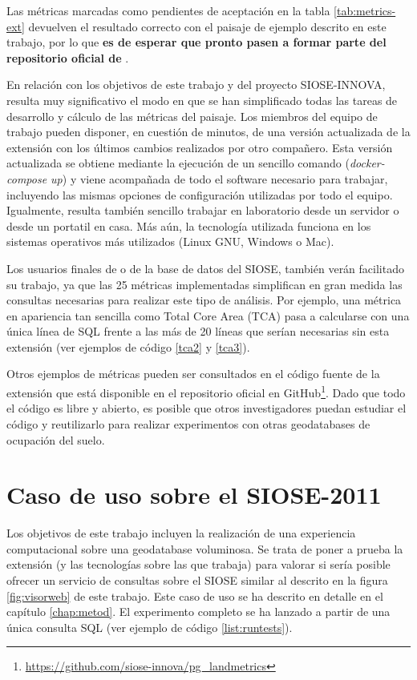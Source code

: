 Las métricas marcadas como pendientes de aceptación en la tabla \ref{tab:metrics-ext} devuelven el resultado correcto con el paisaje de ejemplo descrito en este trabajo, por lo que \textbf{es de esperar que pronto pasen a formar parte del repositorio oficial de \pgland{}}.

En relación con los objetivos de este trabajo y del proyecto SIOSE-INNOVA, resulta muy significativo el modo en que se han simplificado todas las tareas de desarrollo y cálculo de las métricas del paisaje. Los miembros del equipo de trabajo pueden disponer, en cuestión de minutos, de una versión actualizada de la extensión \pgland{} con los últimos cambios realizados por otro compañero. Esta versión actualizada se obtiene mediante la ejecución de un sencillo comando (\textit{docker-compose up}) y viene acompañada de todo el software necesario para trabajar, incluyendo las mismas opciones de configuración utilizadas por todo el equipo. Igualmente, resulta también sencillo trabajar en laboratorio desde un servidor o desde un portatil en casa. Más aún, la tecnología utilizada funciona en los sistemas operativos más utilizados (Linux GNU, Windows o Mac). 

Los usuarios finales de \pgland{} o de la base de datos del SIOSE, también verán facilitado su trabajo, ya que las 25 métricas implementadas simplifican en gran medida las consultas necesarias para realizar este tipo de análisis. Por ejemplo, una métrica en apariencia tan sencilla como Total Core Area (TCA) pasa a calcularse con una única línea de SQL frente a las más de 20 líneas que serían necesarias sin esta extensión (ver ejemplos de código \ref{tca2} y \ref{tca3}).

Otros ejemplos de métricas pueden ser consultados en el código fuente de la extensión \pgland{} que está disponible en el repositorio oficial en GitHub\footnote{\url{https://github.com/siose-innova/pg_landmetrics}}. Dado que todo el código es libre y abierto, es posible que otros investigadores puedan estudiar el código y reutilizarlo para realizar experimentos con otras geodatabases de ocupación del suelo.

\section{Caso de uso sobre el SIOSE-2011 \label{sec:caso_uso}}

Los objetivos de este trabajo incluyen la realización de una experiencia computacional sobre una geodatabase voluminosa. Se trata de poner a prueba la extensión \pgland{} (y las tecnologías sobre las que trabaja) para valorar si sería posible ofrecer un servicio de consultas sobre el SIOSE similar al descrito en la figura \ref{fig:visorweb} de este trabajo. Este caso de uso se ha descrito en detalle en el capítulo \ref{chap:metod}. El experimento completo se ha lanzado a partir de una única consulta SQL (ver ejemplo de código \ref{list:runtests}).

